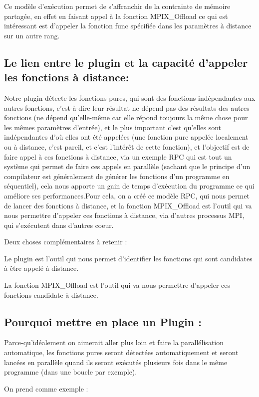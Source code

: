 \documentclass[12pt,a4paper]{article}
\begin{document}
Ce modèle d'exécution permet de s'affranchir de la contrainte de mémoire partagée, en effet en faisant appel à la fonction MPIX\_Offload ce qui est intéressant est d'appeler la fonction func spécifiée dans les paramètres à distance sur un autre rang.

\subsection{Le lien entre le plugin et la capacité d'appeler les fonctions à distance:}
Notre plugin détecte les fonctions pures, qui sont des fonctions indépendantes aux autres fonctions, c'est-à-dire leur résultat ne dépend pas des résultats des autres fonctions (ne dépend qu'elle-même car elle répond toujours la même chose pour les mêmes paramètres d’entrée), et le plus important c'est qu'elles sont indépendantes d'où elles ont été appelées (une fonction pure appelée localement ou à distance, c'est pareil, et c'est l'intérêt de cette fonction), et l'objectif est de faire appel à ces fonctions à distance, via un exemple RPC qui est tout un système qui permet de faire ces appels en parallèle (sachant que le principe d'un compilateur est généralement de générer les fonctions d'un programme en séquentiel), cela nous apporte un gain de temps d’exécution du programme ce qui améliore ses performances.Pour cela, on a créé ce modèle RPC, qui nous permet de lancer des fonctions à distance, et la fonction MPIX\_Offload est l'outil qui va nous permettre d'appeler ces fonctions à distance, via d'autres processus MPI, qui s'exécutent dans d'autres coeur.

Deux choses complémentaires à retenir :

Le plugin est l'outil qui nous permet d'identifier les fonctions qui sont candidates à être appelé à distance.

La fonction MPIX\_Offload est l'outil qui va nous permettre d'appeler ces fonctions candidate à distance.

\subsection{Pourquoi mettre en place un Plugin :}

Parce-qu'idéalement on aimerait aller plus loin et faire la parallélisation automatique, les fonctions pures seront détectées automatiquement et seront lancées en parallèle quand ils seront exécutés plusieurs fois dans le même programme (dans une boucle par exemple).

On prend comme exemple :
\end{document}
